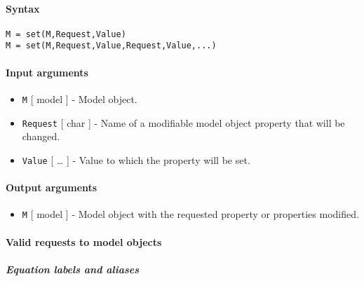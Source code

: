 


	\paragraph{Syntax}

\begin{verbatim}
M = set(M,Request,Value)
M = set(M,Request,Value,Request,Value,...)
\end{verbatim}

\paragraph{Input arguments}

\begin{itemize}
\item
  \texttt{M} {[} model {]} - Model object.
\item
  \texttt{Request} {[} char {]} - Name of a modifiable model object
  property that will be changed.
\item
  \texttt{Value} {[} \ldots{} {]} - Value to which the property will be
  set.
\end{itemize}

\paragraph{Output arguments}

\begin{itemize}
\itemsep1pt\parskip0pt
\item
  \texttt{M} {[} model {]} - Model object with the requested property or
  properties modified.
\end{itemize}

\paragraph{Valid requests to model
objects}

\subparagraph{Equation labels and
aliases}

